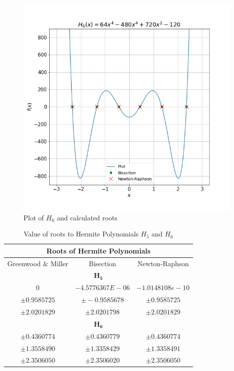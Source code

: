 \documentclass[twocolumn]{article}
\begin{document}
\begin{figure}[h!]
 \centering
 \includegraphics[scale = 0.4]{h6}
 \caption{Plot of $H_6$ and calculated roots}
 \label{fig:h6}
\end{figure}
\begin{table}[h!]
 \centering
 \begin{tabular}{|c|c|c|}
  \hline
  \multicolumn{3}{|c|}{Roots of Hermite Polynomials}\\
  \hline
  Greenwood \& Miller & Bisection & Newton-Raphson\\
  \hline
  \multicolumn{3}{|c|}{$\boldsymbol{H_5}$}\\
  \hline
  $0$ & $-4.5776367E-06$ & $-1.0148108e-10$\\
  $\pm0.9585725$ & $\pm-0.9585678$ & $\pm0.9585725$\\
  $\pm2.0201829$ & $\pm2.0201798$ & $\pm2.0201829$\\
  \hline
  \multicolumn{3}{|c|}{$\boldsymbol{H_6}$}\\
  \hline
  $\pm0.4360774$ & $\pm0.4360779$ & $\pm0.4360774$\\
  $\pm1.3558490$ & $\pm1.3358429$ & $\pm1.3358491$\\
  $\pm2.3506050$ & $\pm2.3506020$ & $\pm2.3506050$ \\
  \hline
 \end{tabular}
\caption{Value of roots to Hermite Polynomials $H_5$ and $H_6$}
\end{table}




\nocite{*}
\end{document}
